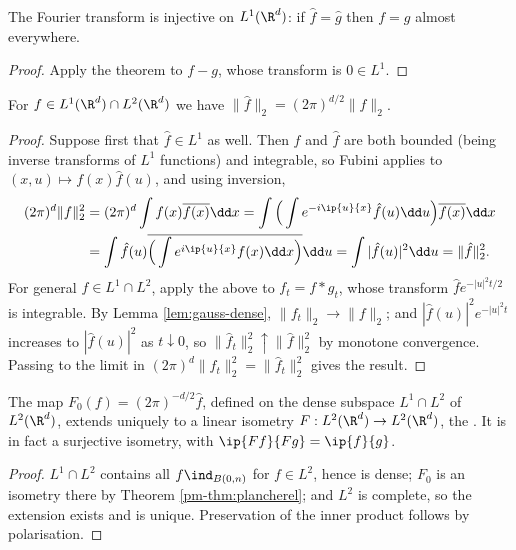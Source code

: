 \begin{corollary}
	The Fourier transform is injective on $L^1(\R^d)$: if $\hat f = \hat g$ then $f = g$ almost everywhere.
\end{corollary}
\begin{proof}
	Apply the theorem to $f - g$, whose transform is $0 \in L^1$.
\end{proof}

\begin{theorem}\label{pm-thm:plancherel}
	For $f \in L^1(\R^d)\cap L^2(\R^d)$ we have $\|\hat f\|_2 = (2\pi)^{d/2}\|f\|_2$.
\end{theorem}
\begin{proof}
	Suppose first that $\hat f \in L^1$ as well. Then $f$ and $\hat f$ are both bounded (being inverse transforms of $L^1$ functions) and integrable, so Fubini applies to $(x,u)\mapsto f(x)\hat f(u)$, and using inversion,
	\begin{align*}
		(2\pi)^d\|f\|_2^2 &= (2\pi)^d\int f(x)\overline{f(x)}\dd x = \int\Big(\int e^{-i\ip{u}{x}}\hat f(u)\dd u\Big)\overline{f(x)}\dd x\\
		&= \int \hat f(u)\overline{\Big(\int e^{i\ip{u}{x}}f(x)\dd x\Big)}\dd u = \int|\hat f(u)|^2\dd u = \|\hat f\|_2^2.
	\end{align*}
	For general $f \in L^1\cap L^2$, apply the above to $f_t = f * g_t$, whose transform $\hat f e^{-|u|^2t/2}$ is integrable. By Lemma \ref{lem:gauss-dense}, $\|f_t\|_2 \to \|f\|_2$; and $|\hat f(u)|^2e^{-|u|^2t}$ increases to $|\hat f(u)|^2$ as $t\downarrow0$, so $\|\hat f_t\|_2^2 \uparrow \|\hat f\|_2^2$ by monotone convergence. Passing to the limit in $(2\pi)^d\|f_t\|_2^2 = \|\hat f_t\|_2^2$ gives the result.
\end{proof}

\begin{corollary}
	The map $F_0(f)=(2\pi)^{-d/2}\hat f$, defined on the dense subspace $L^1\cap L^2$ of $L^2(\R^d)$, extends uniquely to a linear isometry $F : L^2(\R^d)\to L^2(\R^d)$, the . It is in fact a surjective isometry, with $\ip{Ff}{Fg}=\ip{f}{g}$.
\end{corollary}
\begin{proof}
	$L^1 \cap L^2$ contains all $f\ind_{B(0,n)}$ for $f \in L^2$, hence is dense; $F_0$ is an isometry there by Theorem \ref{pm-thm:plancherel}; and $L^2$ is complete, so the extension exists and is unique. Preservation of the inner product follows by polarisation.
\end{proof}

